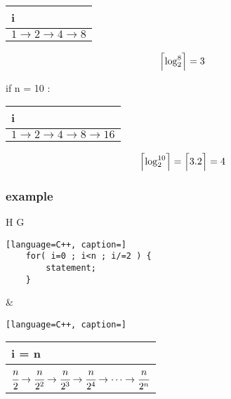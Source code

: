 \documentclass[12pt]{article}
\DeclarePairedDelimiter{\ceil}{\lceil}{\rceil}
\begin{document}
\begin{center}
  \bgroup
  \def\arraystretch{1.5}%
  \begin{tabular}{ l  }
	i
     \\ \hline
     $1 \to 2 \to 4 \to 8$
  \end{tabular}
  \egroup
\end{center}


$$
\ceil[\Big]{\log^{8}_{2}} = 3
$$




if n = 10 :


\begin{center}
  \bgroup
  \def\arraystretch{1.5}%
  \begin{tabular}{ l  }
	i
     \\ \hline
	$1 \to 2 \to 4 \to 8 \to 16$
  \end{tabular}
  \egroup
\end{center}


$$
\ceil[\Big]{\log^{10}_{2}} = \ceil[\Big]{3.2} = 4
$$





\subsubsection{example}

\begin{center}
  \bgroup
  \def\arraystretch{1.5}%
  \begin{tabular}{ H  G  }
	\begin{lstlisting}[language=C++, caption=]
	for( i=0 ; i<n ; i/=2 ) {
		statement;
	}
	\end{lstlisting}
     &  
	\begin{lstlisting}[language=C++, caption=]

	\end{lstlisting}
  \end{tabular}
  \egroup
\end{center}



\begin{center}
  \bgroup
  \def\arraystretch{1.5}%
  \begin{tabular}{ l  }
	i = n
     \\ \hline
     $\cfrac{n}{2} \to \cfrac{n}{2^{2}} \to \cfrac{n}{2^{3}} \to \cfrac{n}{2^{4}} \to \dots \to \cfrac{n}{2^{n}}$
  \end{tabular}
  \egroup
\end{center}
\end{document}
